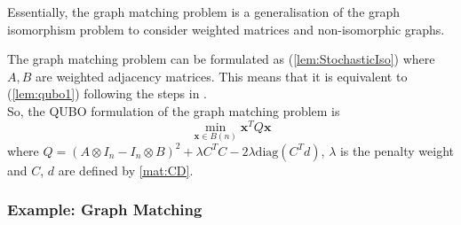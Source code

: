 \documentclass{article}
\begin{document}
\noindent Essentially, the graph matching problem is a generalisation of the graph isomorphism problem to consider weighted matrices and non-isomorphic graphs.

\noindent The graph matching problem can be formulated as (\ref{lem:StochasticIso}) where \(A,B\) are weighted adjacency matrices. This means that it is equivalent to (\ref{lem:qubo1}) following the steps in \cite{klus2023continuous}.\\

\noindent So, the QUBO formulation of the graph matching problem is
\begin{equation*}
	\min_{\mathbf{x} \in B(n)} \mathbf{x}^T Q \mathbf{x}
\end{equation*}
where \(Q = (A \otimes I_n - I_n \otimes B)^2 + \lambda C^T C - 2\lambda\text{diag}(C^T d)\), \(\lambda\) is the penalty weight and \(C\), \(d\) are defined by \ref{mat:CD}.\\

\subsubsection{Example: Graph Matching}
\end{document}
